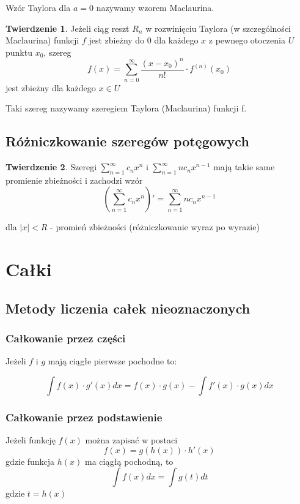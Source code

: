 \documentclass{article}
\theoremstyle{definition}
\theoremstyle{definition}
\newtheorem{tw}{Twierdzenie}[subsection]
\theoremstyle{definition}
\begin{document}
Wzór Taylora dla $a=0$ nazywamy wzorem Maclaurina.

\begin{tw}
Jeżeli ciąg reszt $R_n$ w rozwinięciu Taylora (w szczególności Maclaurina)
funkcji $f$ jest zbieżny do $0$ dla każdego $x$ z pewnego otoczenia $U$
punktu $x_0$, szereg
$$ f(x) = \sum_{n=0}^{\infty} \frac{(x-x_0)^n}{n!} \cdot f^{(n)}(x_0) $$
jest zbieżny dla każdego $x \in U$

Taki szereg nazywamy szeregiem Taylora (Maclaurina) funkcji f.
\end{tw}

\subsection{Różniczkowanie szeregów potęgowych}

\begin{tw}
Szeregi $ \sum_{n=1}^{\infty}c_n x^n $ i $ \sum_{n=1}^{\infty}n c_n x^{n-1} $
mają takie same promienie zbieżności i zachodzi wzór
$$ \left(\sum_{n=1}^{\infty}c_n x^n \right)' =
\sum_{n=1}^{\infty}n c_n x^{n-1} $$

dla $ |x| < R $ - promień zbieżności
(różniczkowanie wyraz po wyrazie)
\end{tw}

\section{Całki}

\subsection{Metody liczenia całek nieoznaczonych}

\subsubsection{Całkowanie przez części}

Jeżeli $f$ i $g$ mają ciągłe pierwsze pochodne to:

$$
\int f(x) \cdot g'(x) dx = f(x) \cdot g(x) - \int f'(x) \cdot g(x) dx
$$

\subsubsection{Całkowanie przez podstawienie}

Jeżeli funkcję $f(x)$ można zapisać w postaci
$$
f(x) = g(h(x)) \cdot h'(x)
$$
gdzie funkcja $h(x)$ ma ciągłą pochodną, to
$$
\int f(x) dx = \int g(t) dt
$$
gdzie $ t = h(x) $
\end{document}
